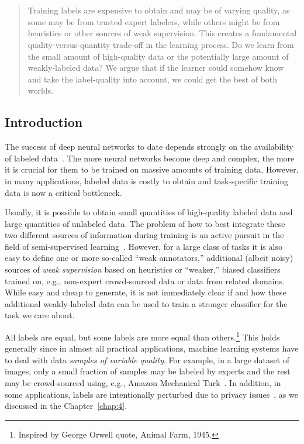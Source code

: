\chapter{}

\label{chap:5}
%
\begin{quote}
Training labels are expensive to obtain and may be of varying quality, as some may be from trusted expert labelers, while others might be from heuristics or other sources of weak supervision. This creates a fundamental quality-versus-quantity trade-off in the learning process.  Do we learn from the small amount of high-quality data or the potentially large amount of weakly-labeled data? We argue that if the learner could somehow know and take the label-quality into account, we could get the best of both worlds.
\end{quote}
%
\section{Introduction}
The success of deep neural networks to date depends strongly on the availability of labeled data~\citep{sun2017revisiting}. The more neural networks become deep and complex, the more it is crucial for them to be trained on massive amounts of training data. However, in many applications, labeled data is costly to obtain and task-specific training data is now a critical bottleneck. 

Usually, it is possible to obtain small quantities of high-quality labeled data and large quantities of unlabeled data. The problem of how to best integrate these two different sources of information during training is an active pursuit in the field of semi-supervised learning~\citep{chap:semi06}.
However, for a large class of tasks it is also easy to define one or more so-called ``weak annotators,'' additional (albeit noisy) sources of \emph{weak supervision} based on heuristics or ``weaker,'' biased classifiers trained on, e.g., non-expert crowd-sourced data or data from related domains. 
While easy and cheap to generate, it is not immediately clear if and how these additional weakly-labeled data can be used to train a stronger classifier for the task we care about.

All labels are equal, but some labels are more equal than others.\footnote{Inspired by George Orwell quote, Animal Farm, 1945.} This holds generally since in almost all practical applications, machine learning systems have to deal with data \emph{samples of variable quality}. For example, in a large dataset of images, only a small fraction of samples may be labeled by experts and the rest may be crowd-sourced using, e.g., Amazon Mechanical Turk~\citep{Veit:2017}. In addition, in some applications, labels are intentionally perturbed due to privacy issues~\citep{wainwright2012privacy,Papernot:2016, dehghani:2017:neuir}, as we discussed in the Chapter~\ref{chap:4}. 

